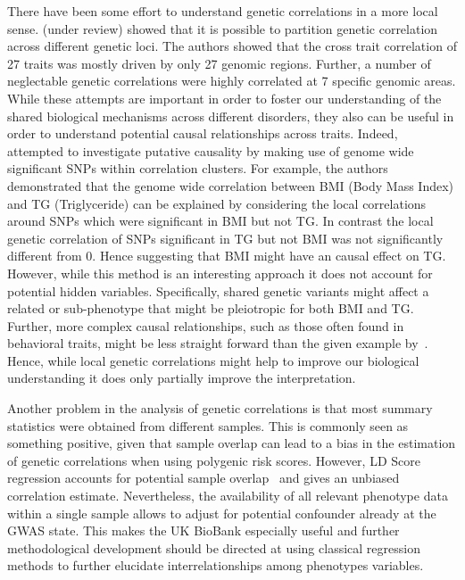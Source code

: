 There have been some effort to understand genetic correlations in a more local sense.
\citet{Shi2016a} (under review) showed that it is possible to partition genetic correlation across different genetic loci.
The authors showed that the cross trait correlation of 27 traits was mostly driven by only 27 genomic regions. 
Further, a number of neglectable genetic correlations were highly correlated at 7 specific genomic areas.
While these attempts are important in order to foster our understanding of the shared biological mechanisms across different disorders, they also can be useful in order to understand potential causal relationships across traits.
Indeed,~\citet{Shi2016a} attempted to investigate putative causality by making use of genome wide significant SNPs within correlation clusters.
For example, the authors demonstrated that the genome wide correlation between BMI (Body Mass Index) and TG (Triglyceride) can be explained by considering the local correlations around SNPs which were significant in BMI but not TG\@.
In contrast the local genetic correlation of SNPs significant in TG  but not BMI was not significantly different from $0$.
Hence suggesting that BMI might have an causal effect on TG\@.
However, while this method is an interesting approach it does not account for potential hidden variables.
Specifically, shared genetic variants might affect a related or sub-phenotype that might be pleiotropic for both BMI and TG\@.
Further, more complex causal relationships, such as those often found in behavioral traits, might be less straight forward than the given example by~\citet{Shi2016a}.
Hence, while local genetic correlations might help to improve our biological understanding it does only partially improve the interpretation.

Another problem in the analysis of genetic correlations is that most summary statistics were obtained from different samples.
This is commonly seen as something positive, given that sample overlap can lead to a bias in the estimation of genetic correlations when using polygenic risk scores. 
However, LD Score regression accounts for potential sample overlap~\cite{Bulik-Sullivan2015a} and gives an unbiased correlation estimate.  
Nevertheless, the availability of all relevant phenotype data within a single sample allows to adjust for potential confounder already at the GWAS state.
This makes the UK BioBank especially useful and further methodological development should be directed at using classical regression methods to further elucidate interrelationships among phenotypes variables.


